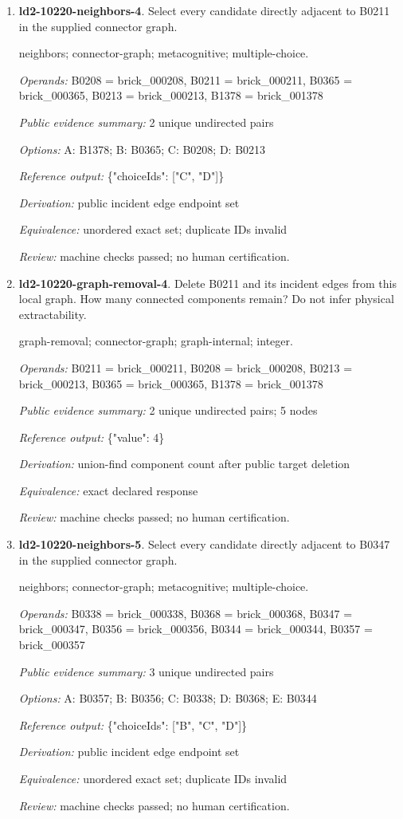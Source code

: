 \begin{enumerate}
\item \textbf{ld2-10220-neighbors-4}. Select every candidate directly adjacent to B0211 in the supplied connector graph.
\par{\small neighbors; connector-graph; metacognitive; multiple-choice.\par\textit{Operands:} B0208 = brick\_000208, B0211 = brick\_000211, B0365 = brick\_000365, B0213 = brick\_000213, B1378 = brick\_001378\par\textit{Public evidence summary:} 2 unique undirected pairs\par\textit{Options:} A: B1378; B: B0365; C: B0208; D: B0213\par\textit{Reference output:} \{"choiceIds": ["C", "D"]\}\par\textit{Derivation:} public incident edge endpoint set\par\textit{Equivalence:} unordered exact set; duplicate IDs invalid\par\textit{Review:} machine checks passed; no human certification.}
\item \textbf{ld2-10220-graph-removal-4}. Delete B0211 and its incident edges from this local graph. How many connected components remain? Do not infer physical extractability.
\par{\small graph-removal; connector-graph; graph-internal; integer.\par\textit{Operands:} B0211 = brick\_000211, B0208 = brick\_000208, B0213 = brick\_000213, B0365 = brick\_000365, B1378 = brick\_001378\par\textit{Public evidence summary:} 2 unique undirected pairs; 5 nodes\par\textit{Reference output:} \{"value": 4\}\par\textit{Derivation:} union-find component count after public target deletion\par\textit{Equivalence:} exact declared response\par\textit{Review:} machine checks passed; no human certification.}
\item \textbf{ld2-10220-neighbors-5}. Select every candidate directly adjacent to B0347 in the supplied connector graph.
\par{\small neighbors; connector-graph; metacognitive; multiple-choice.\par\textit{Operands:} B0338 = brick\_000338, B0368 = brick\_000368, B0347 = brick\_000347, B0356 = brick\_000356, B0344 = brick\_000344, B0357 = brick\_000357\par\textit{Public evidence summary:} 3 unique undirected pairs\par\textit{Options:} A: B0357; B: B0356; C: B0338; D: B0368; E: B0344\par\textit{Reference output:} \{"choiceIds": ["B", "C", "D"]\}\par\textit{Derivation:} public incident edge endpoint set\par\textit{Equivalence:} unordered exact set; duplicate IDs invalid\par\textit{Review:} machine checks passed; no human certification.}

\end{enumerate}
